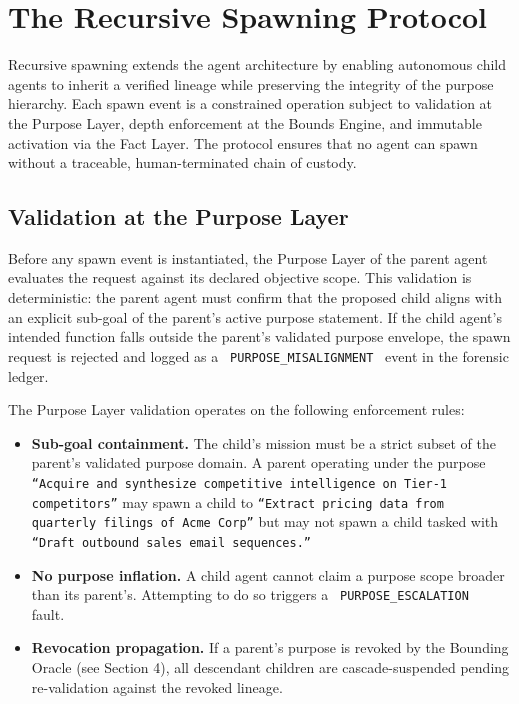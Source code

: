 \section{The Recursive Spawning Protocol}

Recursive spawning extends the agent architecture by enabling autonomous child agents to inherit a verified lineage while preserving the integrity of the purpose hierarchy. Each spawn event is a constrained operation subject to validation at the Purpose Layer, depth enforcement at the Bounds Engine, and immutable activation via the Fact Layer. The protocol ensures that no agent can spawn without a traceable, human-terminated chain of custody.

\subsection{Validation at the Purpose Layer}

Before any spawn event is instantiated, the Purpose Layer of the parent agent evaluates the request against its declared objective scope. This validation is deterministic: the parent agent must confirm that the proposed child aligns with an explicit sub-goal of the parent's active purpose statement. If the child agent's intended function falls outside the parent's validated purpose envelope, the spawn request is rejected and logged as a \texttt{ PURPOSE\_MISALIGNMENT } event in the forensic ledger.

The Purpose Layer validation operates on the following enforcement rules:

\begin{itemize}
    \item \textbf{Sub-goal containment.} The child's mission must be a strict subset of the parent's validated purpose domain. A parent operating under the purpose \texttt{“Acquire and synthesize competitive intelligence on Tier-1 competitors”} may spawn a child to \texttt{“Extract pricing data from quarterly filings of Acme Corp”} but may not spawn a child tasked with \texttt{“Draft outbound sales email sequences.”}
    \item \textbf{No purpose inflation.} A child agent cannot claim a purpose scope broader than its parent's. Attempting to do so triggers a \texttt{ PURPOSE\_ESCALATION } fault.
    \item \textbf{Revocation propagation.} If a parent's purpose is revoked by the Bounding Oracle (see Section 4), all descendant children are cascade-suspended pending re-validation against the revoked lineage.
\end{itemize}

